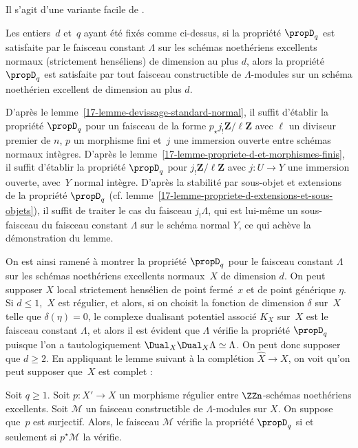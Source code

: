 \documentclass[10pt]{../fichiers-configuration-latex/smfart}
\begin{document}
Il s'agit d'une variante facile de .

\begin{lemme2}
Les entiers $d$ et $q$ ayant été fixés comme ci-dessus, 
si la propriété $\propD_q$ est satisfaite par le faisceau constant $\Lambda$
sur les schémas noethériens excellents normaux (strictement henséliens)
de dimension au plus $d$, alors la propriété $\propD_q$ est satisfaite par
tout faisceau constructible de $\Lambda$-modules sur un schéma noethérien
excellent de dimension au plus $d$.
\end{lemme2}

D'après le lemme~\ref{17-lemme-devissage-standard-normal}, il suffit d'établir
la propriété $\propD_q$ pour un faisceau de la forme $p_\star
j_!\mathbf{Z}/\ell\mathbf{Z}$ avec $\ell$ un diviseur premier de $n$, $p$
un morphisme fini et $j$ une immersion ouverte entre schémas normaux
intègres. D'après le 
lemme~\ref{17-lemme-propriete-d-et-morphismes-finis}, il suffit d'établir la
propriété $\propD_q$ pour $j_!\mathbf{Z}/\ell\mathbf{Z}$ avec $j\colon U\to
Y$ une immersion ouverte, avec $Y$ normal intègre. D'après la 
stabilité par sous-objet et extensions de la propriété $\propD_q$
(cf. lemme~\ref{17-lemme-propriete-d-extensions-et-sous-objets}), il suffit de
traiter le cas du faisceau $j_!\Lambda$, qui est lui-même un sous-faisceau
du faisceau constant $\Lambda$ sur le schéma normal $Y$, ce qui achève la
démonstration du lemme.

\bigskip

On est ainsi ramené à montrer la propriété $\propD_q$ pour le faisceau
constant $\Lambda$ sur les schémas noethériens excellents normaux $X$ de
dimension $d$. On peut supposer
$X$ local strictement hensélien de point fermé $x$ et de point générique
$\eta$. Si $d\leq 1$, $X$ est régulier, et alors, si on choisit la
fonction de dimension $\delta$ sur $X$ telle que $\delta(\eta)=0$,
le complexe dualisant potentiel associé $K_X$ sur $X$ est le
faisceau constant $\Lambda$, et alors il est évident que $\Lambda$ vérifie
la propriété $\propD_q$ puisque l'on a tautologiquement
$\Dual_X\Dual_X\Lambda\simeq \Lambda$. On
peut donc supposer que $d\geq 2$. En appliquant le lemme suivant à la
complétion $\widehat{X}\to X$, on voit qu'on peut supposer que $X$ est
complet :

\begin{lemme2}\label{17-lemme-propriete-d-et-morphismes-reguliers}
Soit $q\geq 1$.
Soit $p\colon X'\to X$ un morphisme régulier
entre $\ZZn$-schémas noethériens excellents. Soit $\mathscr M$
un faisceau constructible de $\Lambda$-modules sur $X$.
On suppose que $p$ est surjectif.
Alors, le faisceau $\mathscr M$ vérifie la propriété $\propD_q$ si et
seulement si $p^\star\mathscr M$ la vérifie.
\end{lemme2}
\end{document}
